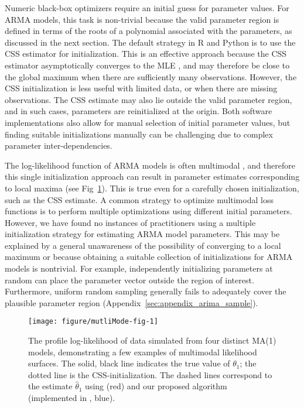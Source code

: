 Numeric black-box optimizers require an initial guess for parameter values.
For ARMA models, this task is non-trivial because the valid parameter region is defined in terms of the roots of a polynomial associated with the parameters, as discussed in the next section.
The default strategy in R and Python is to use the CSS estimator for initialization.
This is an effective approach because the CSS estimator asymptotically converges to the MLE \cite{shumway2017}, and may therefore be close to the global maximum when there are sufficiently many observations.
However, the CSS initialization is less useful with limited data, or when there are missing observations.
The CSS estimate may also lie outside the valid parameter region, and in such cases, parameters are reinitialized at the origin.
Both software implementations also allow for manual selection of initial parameter values, but finding suitable initializations manually can be challenging due to complex parameter inter-dependencies.

The log-likelihood function of ARMA models is often multimodal \cite{ripley2002}, and therefore this single initialization approach can result in parameter estimates corresponding to local maxima (see Fig~\ref{fig:multiMode}).
This is true even for a carefully chosen initialization, such as the CSS estimate.
A common strategy to optimize multimodal loss functions is to perform multiple optimizations using different initial parameters.
However, we have found no instances of practitioners using a multiple initialization strategy for estimating ARMA model parameters.
This may be explained by a general unawareness of the possibility of converging to a local maximum or because obtaining a suitable collection of initializations for ARMA models is nontrivial.
For example, independently initializing parameters at random can place the parameter vector outside the region of interest.
Furthermore, uniform random sampling generally fails to adequately cover the plausible parameter region (Appendix~\ref{sec:appendix_arima_sample}).




\begin{figure}[ht]
\begin{knitrout}
\color{fgcolor}

{\centering \texttt{[image: figure/mutliMode-fig-1]} 

}


\end{knitrout}
\caption{\label{fig:multiMode}The profile log-likelihood of data simulated from four distinct MA(1) models, demonstrating a few examples of multimodal likelihood surfaces. The solid, black line indicates the true value of $\theta_1$; the dotted line is the CSS-initialization. The dashed lines correspond to the estimate $\hat{\theta}_1$ using  (red) and our proposed algorithm (implemented in , blue).}
\end{figure}

